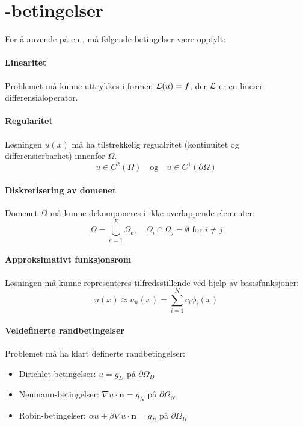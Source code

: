 \section{-betingelser}

For å anvende  på en , må følgende betingelser være oppfylt:

\paragraph{Linearitet} Problemet må kunne uttrykkes i formen \(\mathcal{L}(u) = f\), der \(\mathcal{L}\) er en lineær differensialoperator.

\paragraph{Regularitet} Løsningen \( u(x) \) må ha tilstrekkelig regualritet (kontinuitet og differensierbarhet) innenfor \( \Omega \).
\[
  u \in C^2(\Omega) \quad \text{og} \quad u \in C^1(\partial \Omega)
\]

\paragraph{Diskretisering av domenet} Domenet \( \Omega \) må kunne dekomponeres i ikke-overlappende elementer:
\[
  \Omega = \bigcup_{e=1}^{E} \Omega_e, \quad \Omega_i \cap \Omega_j = \emptyset \text{ for } i \neq j
\]

\paragraph{Approksimativt funksjonsrom} Løsningen må kunne representeres tilfredsstillende ved hjelp av basisfunksjoner:
\[
  u(x) \approx u_h(x) = \sum_{i=1}^{N} c_i \phi_i(x)
\]

\paragraph{Veldefinerte randbetingelser}
Problemet må ha klart definerte randbetingelser:
\begin{itemize}
  \item Dirichlet-betingelser: \( u = g_D \) på \(\partial \Omega_D \)
  \item Neumann-betingelser: \( \nabla u \cdot \mathbf{n} = g_N \) på \(\partial \Omega_N \)
  \item Robin-betingelser: \( \alpha u + \beta \nabla u \cdot \mathbf{n} = g_R \) på \(\partial \Omega_R \)
\end{itemize}

